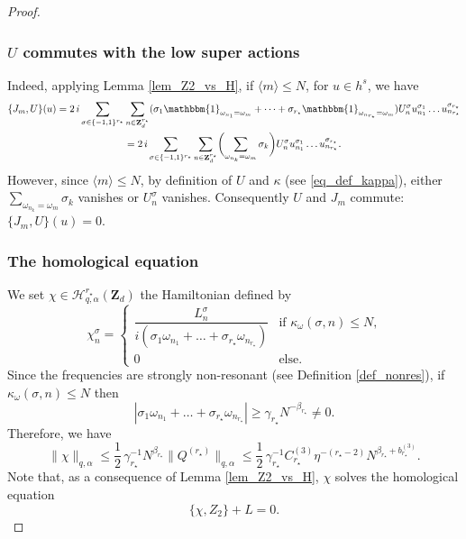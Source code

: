 \begin{proof}
\subsubsection*{$U$ commutes with the low super actions}
Indeed, applying Lemma \ref{lem_Z2_vs_H}, if $\langle m \rangle\leq N$, for $u\in h^s$, we have
\begin{multline*}
\{ J_m, U \}(u) =2 \, i \sum_{\sigma \in \{-1,1\}^{r_\star}} \sum_{n\in \mathbf{Z}_d^{r_\star} } (\sigma_1 \mathbbm{1}_{\omega_{n_1}=\omega_m} + \dots + \sigma_{r_\star} \mathbbm{1}_{\omega_{n_{r_\star}}=\omega_m}) U_{n}^{\sigma} u_{n_1}^{\sigma_1} \dots u_{n_{r_\star}}^{\sigma_{r_\star}}
\\
=2 \, i \sum_{\sigma \in \{-1,1\}^{r_\star}} \sum_{n\in \mathbf{Z}_d^{r_\star} } \biggl(\sum_{\omega_{n_k}=\omega_{m}} \sigma_k\biggr) U_{n}^{\sigma} u_{n_1}^{\sigma_1} \dots u_{n_{r_\star}}^{\sigma_{r_\star}}.
\end{multline*}
However, since $ \langle m \rangle \leq N$, by definition of $U$ and $\kappa$ (see \eqref{eq_def_kappa}), either $\sum_{\omega_{n_k}=\omega_{m}} \sigma_k$ vanishes or $U_{n}^{\sigma}$ vanishes. Consequently $U$ and $J_m$ commute: $\{ J_m, U \}(u)=0$.

\subsubsection*{The homological equation}
We set $\chi \in \mathscr{H}_{q,\alpha}^{r_\star}(\mathbf{Z}_d)$ the Hamiltonian defined by
\[
\chi_n^\sigma =
\begin{cases}
\dfrac{L_n^\sigma}{i(\sigma_1 \omega_{n_1} + \dots + \sigma_{r_\star} \omega_{n_{r_\star}})}& \text{if $\kappa_\omega(\sigma,n) \leq N$,}\\
0&\text{else}.
\end{cases}
\]
Since the frequencies are strongly non-resonant (see Definition \ref{def_nonres}), if $\kappa_\omega(\sigma,n) \leq N$ then
\[
|\sigma_1 \omega_{n_1} + \dots + \sigma_{r_\star} \omega_{n_{r_\star}} |\geq \gamma_{r_\star} N^{-\beta_{r_\star}} \neq 0.
\]
Therefore, we have
\begin{equation}
\label{eq_bound_on_chi}
\| \chi\|_{q,\alpha} \leq \frac12\, \gamma_{r_\star}^{-1} N^{\beta_{r_\star}} \|Q^{(r_\star)} \|_{q,\alpha}\leq \frac12\, \gamma_{r_\star}^{-1} C_{r_\star}^{(3)} \eta^{-(r_\star-2)} N^{\beta_{r_\star}+ b_{r_\star}^{(3)}}.
\end{equation}
Note that, as a consequence of Lemma \ref{lem_Z2_vs_H}, $\chi$ solves the homological equation
\[
\{ \chi, Z_2\} + L =0.
\]


\end{proof}
